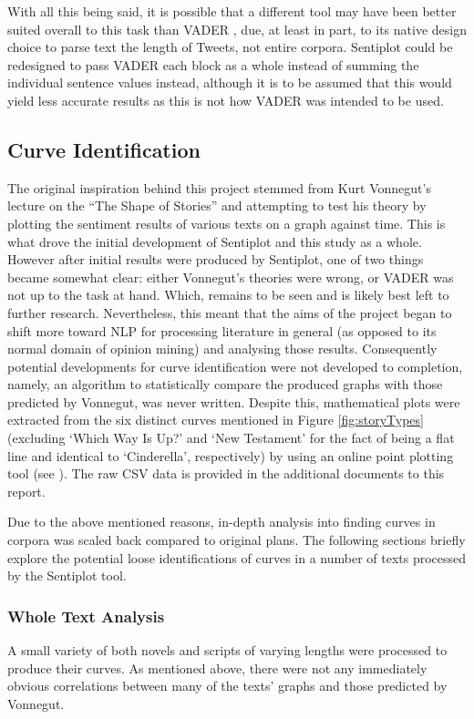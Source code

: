 \documentclass{article}
\begin{document}
{        With all this being said, it is possible that a different tool may have been better suited overall to this task than VADER , due, at least in part, to its native design choice to parse text the length of Tweets, not entire corpora. Sentiplot could be redesigned to pass VADER each block as a whole instead of summing the individual sentence values instead, although it is to be assumed that this would yield less accurate results as this is not how VADER was intended to be used.
    \subsection{Curve Identification}
    \label{subsec:curves}
        The original inspiration behind this project stemmed from Kurt Vonnegut's lecture on the ``The Shape of Stories'' and attempting to test his theory by plotting the sentiment results of various texts on a graph against time. This is what drove the initial development of Sentiplot and this study as a whole. However after initial results were produced by Sentiplot, one of two things became somewhat clear: either Vonnegut's theories were wrong, or VADER was not up to the task at hand. Which, remains to be seen and is likely best left to further research. Nevertheless, this meant that the aims of the project began to shift more toward NLP for processing literature in general (as opposed to its normal domain of opinion mining) and analysing those results. Consequently potential developments for curve identification were not developed to completion, namely, an algorithm to statistically compare the produced graphs with those predicted by Vonnegut, was never written. Despite this, mathematical plots were extracted from the six distinct curves mentioned in Figure \ref{fig:storyTypes} (excluding `Which Way Is Up?' and `New Testament' for the fact of being a flat line and identical to `Cinderella', respectively) by using an online point plotting tool (see \cite{webPlotDigitizer}). The raw CSV data is provided in the additional documents to this report.

        Due to the above mentioned reasons, in-depth analysis into finding curves in corpora was scaled back compared to original plans. The following sections briefly explore the potential loose identifications of curves in a number of texts processed by the Sentiplot tool.
        \subsubsection{Whole Text Analysis}
            A small variety of both novels and scripts of varying lengths were processed to produce their curves. As mentioned above, there were not any immediately obvious correlations between many of the texts' graphs and those predicted by Vonnegut.
            
}
\end{document}
